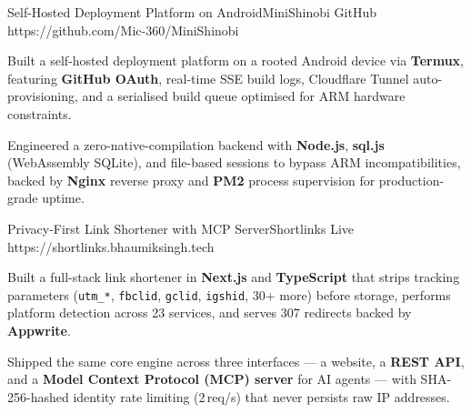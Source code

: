 \documentclass{bhaumic}
\begin{document}
\begin{samepage}
\projentry
  {Self-Hosted Deployment Platform on Android}{MiniShinobi}
  {GitHub}
  {https://github.com/Mic-360/MiniShinobi}
  {
    \begin{resbullets}
      \item Built a self-hosted deployment platform on a rooted Android device via \textbf{Termux}, featuring \textbf{GitHub OAuth}, real-time SSE build logs, Cloudflare Tunnel auto-provisioning, and a serialised build queue optimised for ARM hardware constraints.
      \item Engineered a zero-native-compilation backend with \textbf{Node.js}, \textbf{sql.js} (WebAssembly SQLite), and file-based sessions to bypass ARM incompatibilities, backed by \textbf{Nginx} reverse proxy and \textbf{PM2} process supervision for production-grade uptime.
    \end{resbullets}
  }
\end{samepage}

\begin{samepage}
\projentry
  {Privacy-First Link Shortener with MCP Server}{Shortlinks}
  {Live}
  {https://shortlinks.bhaumiksingh.tech}
  {
    \begin{resbullets}
      \item Built a full-stack link shortener in \textbf{Next.js} and \textbf{TypeScript} that strips tracking parameters (\texttt{utm\_*}, \texttt{fbclid}, \texttt{gclid}, \texttt{igshid}, 30+ more) before storage, performs platform detection across 23 services, and serves 307 redirects backed by \textbf{Appwrite}.
      \item Shipped the same core engine across three interfaces --- a website, a \textbf{REST API}, and a \textbf{Model Context Protocol (MCP) server} for AI agents --- with SHA-256-hashed identity rate limiting (2\,req/s) that never persists raw IP addresses.
    \end{resbullets}
  }
\end{samepage}
\end{document}
